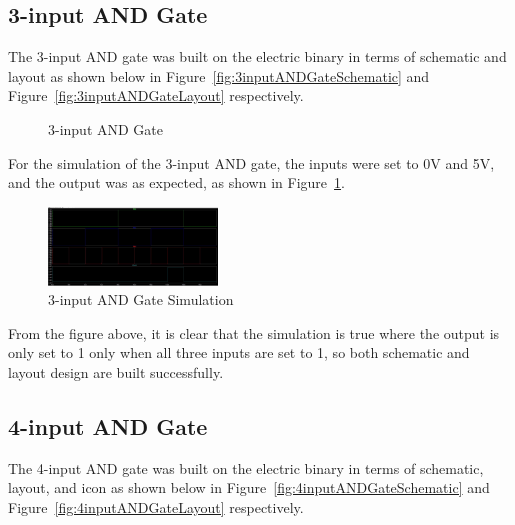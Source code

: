 \documentclass[conference]{IEEEtran}
\begin{document}
\subsection{3-input AND Gate}
The 3-input AND gate was built on the electric binary in terms of schematic and layout as shown below in Figure~\ref{fig:3inputANDGateSchematic} and Figure~\ref{fig:3inputANDGateLayout} respectively.
\begin{figure}[h]
    \centering
    \hfill
    \caption{3-input AND Gate}
\end{figure}
For the simulation of the 3-input AND gate, the inputs were set to 0V and 5V, and the output was as expected, as shown in Figure~\ref{fig:3inputANDGateSimulation}.
\begin{figure}[h]
    \centering
    \includegraphics[width=0.4\textwidth]{assets/3inputANDGateSimulation.jpg}
    \caption{3-input AND Gate Simulation}
    \label{fig:3inputANDGateSimulation}
\end{figure}
From the figure above, it is clear that the simulation is true where the output is only set to 1 only when all three inputs are set to 1, so both schematic and layout design are built successfully.

\subsection{4-input AND Gate}
The 4-input AND gate was built on the electric binary in terms of schematic, layout, and icon as shown below in Figure~\ref{fig:4inputANDGateSchematic} and Figure~\ref{fig:4inputANDGateLayout} respectively.
\end{document}
